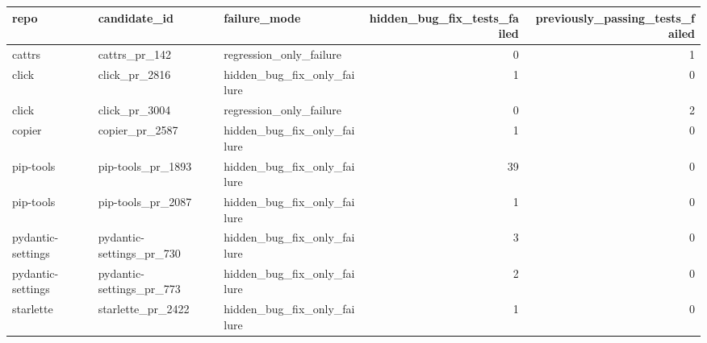 \begin{tabular}{lllrr}
\toprule
repo & candidate\_id & failure\_mode & hidden\_bug\_fix\_tests\_failed & previously\_passing\_tests\_failed \\
\midrule
cattrs & cattrs\_pr\_142 & regression\_only\_failure & 0 & 1 \\
click & click\_pr\_2816 & hidden\_bug\_fix\_only\_failure & 1 & 0 \\
click & click\_pr\_3004 & regression\_only\_failure & 0 & 2 \\
copier & copier\_pr\_2587 & hidden\_bug\_fix\_only\_failure & 1 & 0 \\
pip-tools & pip-tools\_pr\_1893 & hidden\_bug\_fix\_only\_failure & 39 & 0 \\
pip-tools & pip-tools\_pr\_2087 & hidden\_bug\_fix\_only\_failure & 1 & 0 \\
pydantic-settings & pydantic-settings\_pr\_730 & hidden\_bug\_fix\_only\_failure & 3 & 0 \\
pydantic-settings & pydantic-settings\_pr\_773 & hidden\_bug\_fix\_only\_failure & 2 & 0 \\
starlette & starlette\_pr\_2422 & hidden\_bug\_fix\_only\_failure & 1 & 0 \\
\bottomrule
\end{tabular}
